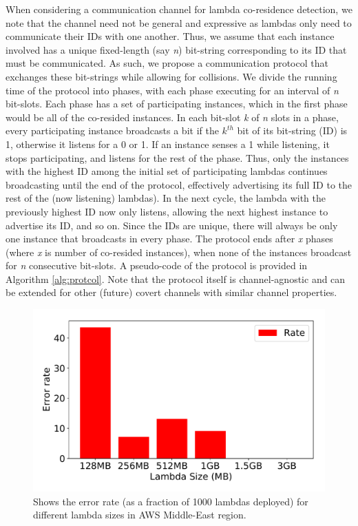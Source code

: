 When considering a communication channel for lambda co-residence detection, we
note that the channel need not be general and expressive as lambdas only need to
communicate their IDs with one another. Thus, we assume that each instance
involved has a unique fixed-length (say \emph{n}) bit-string corresponding to
its ID that must be communicated.  As such, we propose a communication protocol
that exchanges these bit-strings while allowing for collisions. We divide the
running time of the protocol into phases, with each phase executing for an
interval of \textit{n} bit-slots. Each phase has a set of participating
instances, which in the first phase would be all of the co-resided instances. In
each bit-slot \textit{k} of \textit{n} slots in a phase, every participating
instance broadcasts a bit if the $k^{th}$ bit of its bit-string (ID) is 1,
otherwise it listens for a 0 or 1. If an instance senses a 1 while listening, it
stops participating, and listens for the rest of the phase. Thus, only the
instances with the highest ID among the initial set of participating lambdas
continues broadcasting until the end of the protocol, effectively advertising
its full ID to the rest of the (now listening) lambdas). In the next cycle, the
lambda with the previously highest ID now only listens, allowing the next
highest instance to advertise its ID, and so on.  Since the IDs are unique,
there will always be only one instance that broadcasts in every phase. The
protocol ends after \textit{x} phases (where \textit{x} is number of co-resided
instances), when none of the instances broadcast for \textit{n} consecutive
bit-slots.  A pseudo-code of the protocol is provided in Algorithm
\ref{alg:protcol}. Note that the protocol itself is channel-agnostic and can be
extended for other (future) covert channels with similar channel properties.

\begin{figure}[!t]
  \includegraphics[width=.99\linewidth]{fig/errorrates.pdf}
  \caption{Shows the error rate (as a fraction of 1000 lambdas deployed) for different lambda sizes in AWS Middle-East region. 
\label{fig:errorrates}}
\end{figure}

